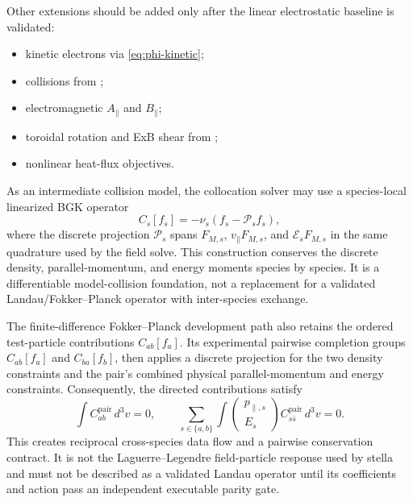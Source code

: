 \documentclass[11pt,a4paper]{article}
\begin{document}
Other extensions should be added only after the linear electrostatic baseline is validated:
\begin{itemize}
  \item kinetic electrons via \eqref{eq:phi-kinetic};
  \item collisions from ;
  \item electromagnetic \(A_\parallel\) and \(B_\parallel\);
  \item toroidal rotation and ExB shear from ;
  \item nonlinear heat-flux objectives.
\end{itemize}

As an intermediate collision model, the collocation solver may use a
species-local linearized BGK operator
\begin{equation}
  C_s[f_s] = -\nu_s\left(f_s-\mathcal{P}_s f_s\right),
\end{equation}
where the discrete projection $\mathcal{P}_s$ spans $F_{M,s}$,
$v_\parallel F_{M,s}$, and $\mathcal{E}_s F_{M,s}$ in the same quadrature used
by the field solve.  This construction conserves the discrete density,
parallel-momentum, and energy moments species by species.  It is a
differentiable model-collision foundation, not a replacement for a validated
Landau/Fokker--Planck operator with inter-species exchange.

The finite-difference Fokker--Planck development path also retains the ordered
test-particle contributions \(C_{ab}[f_a]\).  Its experimental pairwise
completion groups \(C_{ab}[f_a]\) and \(C_{ba}[f_b]\), then applies a discrete
projection for the two density constraints and the pair's combined physical
parallel-momentum and energy constraints.  Consequently, the directed
contributions satisfy
\begin{equation}
  \int C_{ab}^{\mathrm{pair}}\,d^3v = 0,
  \qquad
  \sum_{s\in\{a,b\}} \int
  \begin{pmatrix}p_{\parallel,s}\\ E_s\end{pmatrix}
  C_{s\bar{s}}^{\mathrm{pair}}\,d^3v = 0.
\end{equation}
This creates reciprocal cross-species data flow and a pairwise conservation
contract.  It is not the Laguerre--Legendre field-particle response used by
stella and must not be described as a validated Landau operator until its
coefficients and action pass an independent executable parity gate.
\end{document}

